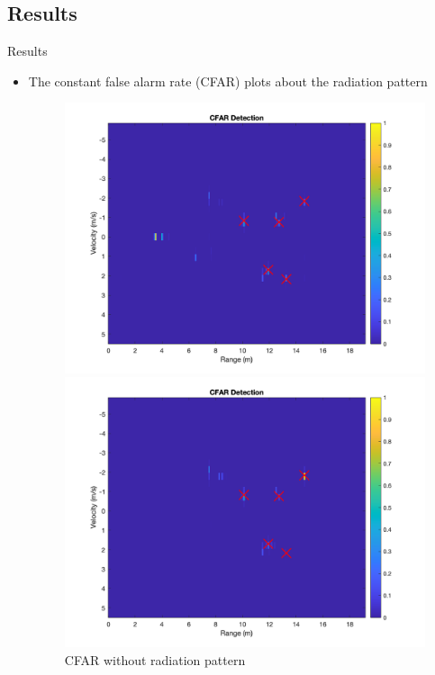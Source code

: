 \documentclass{beamer}
\newcounter{section}
\begin{document}
\subsection{Results}
\begin{frame}[t]{Results}
	\begin{itemize}
	    \item The constant false alarm rate (CFAR) plots about the radiation pattern
        \vspace{0.5\baselineskip}
            \begin{figure}
                \centering
                \begin{minipage}{0.45\textwidth}
                    \centering
                    \includegraphics[height=0.8\textwidth]{figures/1c_empty.png}
                    \caption{CFAR without radiation pattern}
                \end{minipage}
                \begin{minipage}{0.45\textwidth}
                    \centering
                    \includegraphics[height=0.8\textwidth]{figures/3c_beampattern.png}

\end{minipage}
\end{figure}
\end{itemize}
\end{frame}
\end{document}
